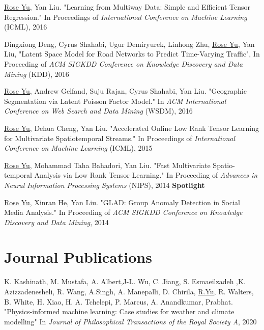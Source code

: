 \documentclass[margin,line]{res}
\begin{document}
\begin{resume}
\begin{enumerate}[label={[C\arabic*]},  leftmargin=*]
\item \underline{Rose Yu}, Yan Liu. "Learning from Multiway Data: Simple and Efficient Tensor Regression." In Proceedings  of  \textit{International Conference on Machine Learning }(ICML),   2016

\item Dingxiong Deng, Cyrus Shahabi, Ugur Demiryurek, Linhong Zhu,  \underline{Rose Yu}, Yan Liu, 
"Latent Space Model for Road Networks to Predict Time-Varying Traffic", In Proceeding of  \textit{ACM SIGKDD Conference on Knowledge Discovery and Data Mining } (KDD), 2016


\item \underline{Rose Yu}, Andrew Gelfand, Suju Rajan, Cyrus Shahabi, Yan Liu. "Geographic Segmentation via Latent Poisson Factor Model." In \textit{ACM International Conference on Web Search and Data Mining} (WSDM), 2016 

\item \underline{Rose Yu}, Dehua Cheng, Yan Liu. "Accelerated Online Low Rank Tensor Learning for Multivariate Spatiotemporal Streams." In Proceedings  of  \textit{International Conference on Machine Learning} (ICML), 2015

\item \underline{Rose Yu}, Mohammad Taha Bahadori, Yan Liu. "Fast Multivariate Spatio-temporal Analysis via Low Rank Tensor Learning." In Proceeding of  \textit{Advances in Neural Information Processing Systems} (NIPS), 2014 \textbf{Spotlight}

\item \underline{Rose Yu}, Xinran He, Yan Liu. "GLAD: Group Anomaly Detection in Social Media Analysis." In Proceeding of  \textit{ACM SIGKDD Conference on Knowledge Discovery and Data Mining}, 2014

%
\end{enumerate}

\section{\sc Journal Publications}
\begin{enumerate}[label={[J\arabic*]},leftmargin=*]
\item K. Kashinath, M. Mustafa, A. Albert,J-L. Wu, C. Jiang, S. Esmaeilzadeh ,K. Azizzadenesheli, R. Wang, A.Singh, A. Manepalli, D. Chirila, \underline{R.Yu}, R. Walters, B. White, H. Xiao, H. A. Tchelepi, P. Marcus, A. Anandkumar,  Prabhat. "Physics-informed machine learning: Case studies for weather and climate modelling" In \textit{Journal of Philosophical Transactions of the Royal Society  A}, 2020


\end{enumerate}
\end{resume}
\end{document}
